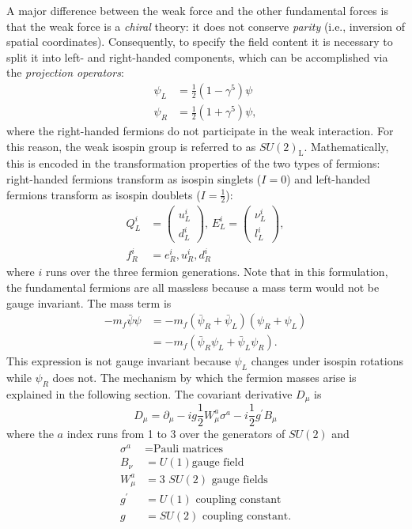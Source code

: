 A major difference between the weak force and the other fundamental forces is
that the weak force is a \textit{chiral} theory: it does not conserve
\textit{parity} (i.e., inversion of spatial coordinates). Consequently, to
specify the field content it is necessary to split it into left- and
right-handed components, which can be accomplished via the \emph{projection
operators}:
\begin{align}
  \psi_L &= \frac{1}{2}(1-\gamma^5)\psi \\
  \psi_R &= \frac{1}{2}(1+\gamma^5)\psi,
\end{align}
where the right-handed fermions do not participate in the weak interaction. For
this reason, the weak isospin group is referred to as $SU(2)_\text{L}$.
Mathematically, this is encoded in the transformation properties of the two
types of fermions: right-handed fermions transform as isospin singlets ($I=0$)
and left-handed fermions transform as isospin doublets ($I=\frac{1}{2}$):
\begin{align}
  Q^i_L &= \left(
    \begin{array}{c}
      u^i_L \\
      d^i_L
    \end{array}
  \right),\,
  E^i_L = \left(
    \begin{array}{c}
      \nu^i_L \\
      l^i_L
    \end{array}
  \right), \\
  f^i_R &= e^i_R, u^i_R, d^i_R
\end{align}
where $i$ runs over the three fermion generations. Note that in this formulation, the fundamental fermions are all massless because a mass term would not be gauge invariant. The mass term is
\begin{align}
  -m_f\bar{\psi}\psi &= -m_f(\bar{\psi}_R + \bar{\psi}_L)(\psi_R + \psi_L) \\
                     &= -m_f(\bar{\psi}_R\psi_L+\bar{\psi}_L\psi_R).
  \label{eq:fermion_mass}
\end{align}
This expression is not gauge invariant because $\psi_L$ changes under isospin rotations while $\psi_R$ does not. The mechanism by which the fermion masses arise is explained in the following section. The covariant derivative $D_\mu$ is
\begin{equation}
  D_\mu = \partial_\mu - i g \frac{1}{2} W_\mu^a\sigma^a - i \frac{1}{2}g^\prime B_\mu
  \label{eq:electroweak_derivative}
\end{equation}
where the $a$ index runs from 1 to 3 over the generators of $SU(2)$ and
\begin{align}
  \sigma^a &= \text{Pauli matrices} \\
  B_\nu &= \text{$U(1)$
  gauge field} \\
  W_\mu^a &= \text{3 $SU(2)$ gauge fields} \\
  g^\prime &= \text{$U(1)$ coupling constant} \\
  g &= \text{$SU(2)$ coupling constant}.
\end{align}

